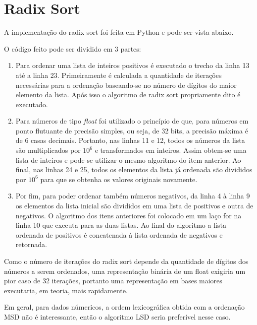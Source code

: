 \documentclass[10pt,a4paper]{article}
\begin{document}
	\section{Radix Sort}
	
		A implementação do radix sort foi feita em Python e pode ser vista abaixo.
		
		O código feito pode ser dividido em 3 partes:
		
		\begin{enumerate}
	
			\item Para ordenar uma lista de inteiros positivos é executado o trecho da linha 13 
			até a linha 23. Primeiramente é calculada a quantidade de iterações necessárias 
			para a ordenação baseando-se no número de dígitos do maior elemento da lista. Após 
			isso o algoritmo de radix sort propriamente dito é executado.
			
			\item Para números de tipo \emph{float} foi utilizado o princípio de que, para números 
			em ponto flutuante de precisão simples, ou seja, de 32 bits, a precisão máxima é de 6 
			casas decimais. Portanto, nas linhas 11 e 12, todos os números da lista são multiplicados 
			por $10^6$ e transformados em inteiros. Assim obtem-se uma lista de inteiros e pode-se 
			utilizar o mesmo algoritmo do item anterior. Ao final, nas linhas 24 e 25, todos os 
			elementos da lista já ordenada são divididos por $10^6$ para que se obtenha os valores 
			originais novamente.
			
			\item Por fim, para poder ordenar também números negativos, da linha 4 à linha 9 os 
			elementos da lista inicial são divididos em uma lista de positivos e outra de negativos.
			O algoritmo dos itens anteriores foi colocado em um laço for na linha 10 que executa para 
			as duas listas. Ao final do algoritmo a lista ordenada de positivos é concatenada à lista 
			ordenada de negativos e retornada.
	
		\end{enumerate}
	
		
		
		Como o número de iterações do radix sort depende da quantidade de dígitos dos números a serem 
		ordenados, uma representação binária de um float exigiria um pior caso de 32 iterações, portanto 
		uma representação em bases maiores executaria, em teoria, mais rapidamente.
		
		Em geral, para dados númericos, a ordem lexicográfica obtida com a ordenação MSD não é interessante, 
		então o algoritmo LSD seria preferível nesse caso.
	
\end{document}
